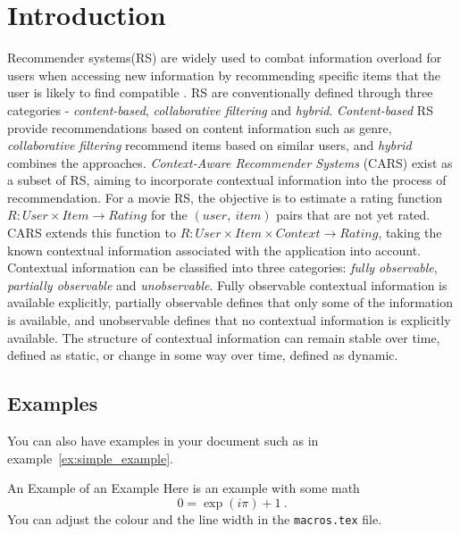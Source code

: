 \chapter{Introduction}\label{ch:introduction}
Recommender systems(RS) are widely used to combat information overload for users when accessing new information by recommending specific items that the user is likely to find compatible \cite{YouTubeNeural,IndustryPerspective}.
RS are conventionally defined through three categories - \textit{content-based}, \textit{collaborative filtering} and \textit{hybrid}.
\textit{Content-based} RS provide recommendations based on content information such as genre, \textit{collaborative filtering} recommend items based on similar users, and \textit{hybrid} combines the approaches\cite{ContextSurvey2020}.
\textit{Context-Aware Recommender Systems} (CARS) exist as a subset of RS, aiming to incorporate contextual information into the process of recommendation.
For a movie RS, the objective is to estimate a rating function $R: User \times Item \rightarrow Rating$ for the $(user, \ item)$ pairs that are not yet rated\cite{RecommenderHandbook2015}.
CARS extends this function to $R: User \times Item \times Context \rightarrow Rating$, taking the known contextual information associated with the application into account.
Contextual information can be classified into three categories: \textit{fully observable}, \textit{partially observable} and \textit{unobservable}.
Fully observable contextual information is available explicitly, partially observable defines that only some of the information is available, and unobservable defines that no contextual information is explicitly available.
The structure of contextual information can remain stable over time, defined as static, or change in some way over time, defined as dynamic.

\section{Examples}
You can also have examples in your document such as in example~\ref{ex:simple_example}.
\begin{example}{An Example of an Example}
  \label{ex:simple_example}
  Here is an example with some math
  \begin{equation}
    0 = \exp(i\pi)+1\ .
  \end{equation}
  You can adjust the colour and the line width in the {\tt macros.tex} file.
\end{example}

